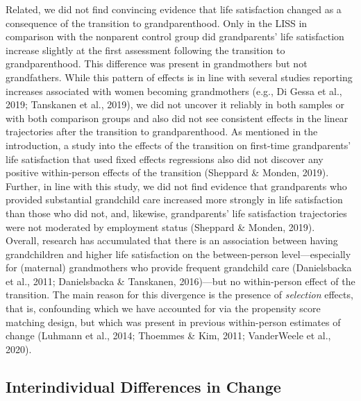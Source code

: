 \documentclass[
  english,
  man, noextraspace]{apa7}
\begin{document}
Related, we did not find convincing evidence that life satisfaction changed as a consequence of the transition to grandparenthood. Only in the LISS in comparison with the nonparent control group did grandparents' life satisfaction increase slightly at the first assessment following the transition to grandparenthood. This difference was present in grandmothers but not grandfathers. While this pattern of effects is in line with several studies reporting increases associated with women becoming grandmothers (e.g., Di Gessa et al., 2019; Tanskanen et al., 2019), we did not uncover it reliably in both samples or with both comparison groups and also did not see consistent effects in the linear trajectories after the transition to grandparenthood. As mentioned in the introduction, a study into the effects of the transition on first-time grandparents' life satisfaction that used fixed effects regressions also did not discover any positive within-person effects of the transition (Sheppard \& Monden, 2019). Further, in line with this study, we did not find evidence that grandparents who provided substantial grandchild care increased more strongly in life satisfaction than those who did not, and, likewise, grandparents' life satisfaction trajectories were not moderated by employment status (Sheppard \& Monden, 2019).\\
Overall, research has accumulated that there is an association between having grandchildren and higher life satisfaction on the between-person level---especially for (maternal) grandmothers who provide frequent grandchild care (Danielsbacka et al., 2011; Danielsbacka \& Tanskanen, 2016)---but no within-person effect of the transition. The main reason for this divergence is the presence of \emph{selection} effects, that is, confounding which we have accounted for via the propensity score matching design, but which was present in previous within-person estimates of change (Luhmann et al., 2014; Thoemmes \& Kim, 2011; VanderWeele et al., 2020).

\hypertarget{interindividual-differences-in-change-1}{%
\subsection{Interindividual Differences in Change}\label{interindividual-differences-in-change-1}}
\end{document}
